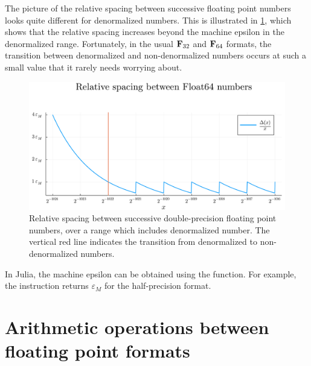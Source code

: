 The picture of the relative spacing between successive floating point numbers looks quite different for denormalized numbers.
This is illustrated in \cref{fig:float64_spacing_denormalized},
which shows that the relative spacing increases beyond the machine epsilon in the denormalized range.
Fortunately, in the usual $\mathbf F_{32}$ and $\mathbf F_{64}$ formats,
the transition between denormalized and non-denormalized numbers occurs at such a small value that
it rarely needs worrying about.

\begin{figure}[ht]
    \centering
    \includegraphics[width=.65\textwidth]{figures/float64_spacing_denormalized.pdf}
    \caption{%
        Relative spacing between successive double-precision floating point numbers,
        over a range which includes denormalized number.
        The vertical red line indicates the transition from denormalized to non-denormalized numbers.
    }%
    \label{fig:float64_spacing_denormalized}
\end{figure}

\begin{example}
    In Julia,
    the machine epsilon can be obtained using the  function.
    For example, the instruction  returns $\varepsilon_M$ for the half-precision format.
\end{example}


\section{Arithmetic operations between floating point formats}%
\label{sec:arithmetic_operations_between_floating_point_formats}

